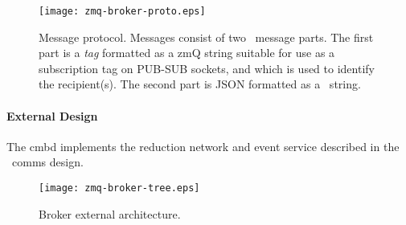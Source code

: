 \begin{figure}
\centering
\texttt{[image: zmq-broker-proto.eps]}
\caption{Message protocol.  Messages consist of two \zMQ\ message parts.
The first part is a {\em tag} formatted as a zmQ string suitable for
use as a subscription tag on PUB-SUB sockets, and which is used to identify
the recipient(s).
The second part is JSON formatted as a \zMQ\ string.}
\label{fig:cmbproto}
\end{figure}

\paragraph {External Design}
The cmbd implements the reduction network and event service described
in the \ngrm\ comms design.

\begin{figure}
\centering
\texttt{[image: zmq-broker-tree.eps]}
\caption{Broker external architecture.}
\label{fig:cmbext}
\end{figure}


